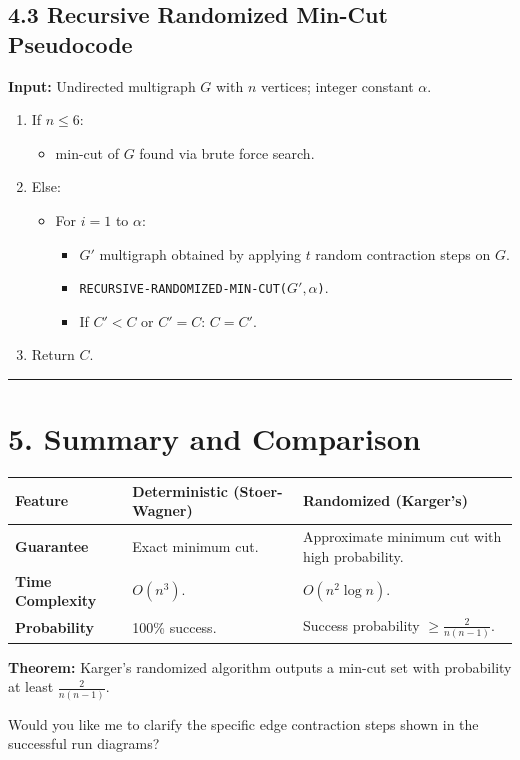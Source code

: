 \documentclass[12pt]{article}
\begin{document}
\subsection*{4.3 Recursive Randomized Min-Cut Pseudocode}

\textbf{Input:} Undirected multigraph $G$ with $n$ vertices; integer constant $\alpha$.

\begin{enumerate}
\item If $n \leq 6$:
\begin{itemize}
\item min-cut of $G$ found via brute force search.
\end{itemize}

\item Else:
\begin{itemize}
\item For $i = 1$ to $\alpha$:
\begin{itemize}
\item $G'$ multigraph obtained by applying $t$ random contraction steps on $G$.

\item \texttt{RECURSIVE-RANDOMIZED-MIN-CUT($G', \alpha$)}.

\item If $C' < C$ or $C' = C$: $C = C'$.
\end{itemize}
\end{itemize}

\item Return $C$.
\end{enumerate}

\hrule
\vspace{0.5em}

\section*{5. Summary and Comparison}

\begin{center}
\begin{tabular}{|p{4cm}|p{5cm}|p{5cm}|}
\hline
\textbf{Feature} & \textbf{Deterministic (Stoer-Wagner)} & \textbf{Randomized (Karger's)} \\
\hline
\textbf{Guarantee} & Exact minimum cut. & Approximate minimum cut with high probability. \\
\hline
\textbf{Time Complexity} & $O(n^3)$. & $O(n^2 \log n)$. \\
\hline
\textbf{Probability} & 100\% success. & Success probability $\geq \frac{2}{n(n-1)}$. \\
\hline
\end{tabular}
\end{center}

\textbf{Theorem:} Karger's randomized algorithm outputs a min-cut set with probability at least $\frac{2}{n(n-1)}$.

Would you like me to clarify the specific edge contraction steps shown in the successful run diagrams?
\end{document}

